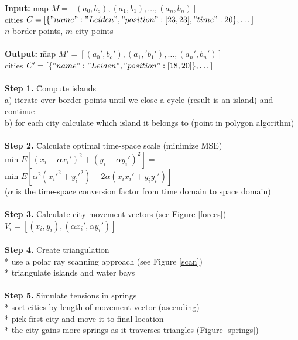 \documentclass[a4paper,11pt]{article}
\newenvironment{boxedcode}
 {\setlength{\fboxsep}{1em}%
  \begin{lrbox}{\boxedcodebox}
  \begin{minipage}{\dimexpr\textwidth-2\fboxsep-2\fboxrule\relax}
  \begin{tabbing}}
 {\end{tabbing}
  \end{minipage}
  \end{lrbox}%
  \fbox{\usebox{\boxedcodebox}}}
\begin{document}
\begin{center}
\begin{boxedcode}
  \textbf{Input:}
  \= map $M=[(a_0,b_o),(a_1, b_1),\dots, (a_n, b_n)]$\\
  \> cities $C=[\{"name":"Leiden", "position": [23,23],
  "time":20\},\dots]$\\
  \> $n$ border points, $m$ city points\\
  \\
  \textbf{Output:}
  \= map $M'=[(a_0',b_o'),(a_1,' b_1'),\dots, (a_n', b_n')]$\\
  \> cities $C'=[\{"name":"Leiden", "position": [18,20]\},\dots]$\\
  \\
  \textbf{Step 1.} \= Compute islands\\
  \> a) iterate over border points until we close a cycle (result is
  an island) and continue\\
  \> b) for each city calculate which island it belongs to (point in
  polygon algorithm)\\
  \\
  \textbf{Step 2.} \= Calculate optimal time-space scale (minimize
  MSE)\\
  \> min $E[(x_i-\alpha x_i')^2+(y_i-\alpha y_i')^2] =$\\
  \> min $E[\alpha^2(x_i'^2+y_i'^2) - 2\alpha (x_ix_i' + y_iy_i')]$\\
  \> ($\alpha$ is the time-space conversion factor from time domain to
  space domain)\\
  \\
  \textbf{Step 3.} \= Calculate city movement vectors (see Figure
  \ref{forces})\\
  \> $V_i = [(x_i, y_i), (\alpha x_i', \alpha y_i')]$\\
  \\
  \textbf{Step 4.} \= Create triangulation\\
  \> * use a polar ray scanning approach (see Figure \ref{scan})\\
  \> * triangulate islands and water bays\\
  \\
  \textbf{Step 5.} \= Simulate tensions in springs\\
  \> * sort cities by length of movement vector (ascending)\\
  \> * pick first city and move it to final location\\
  \> * the city gains more springs as it traverses triangles (Figure
  \ref{springs})\\

\end{boxedcode}
\end{center}
\end{document}
